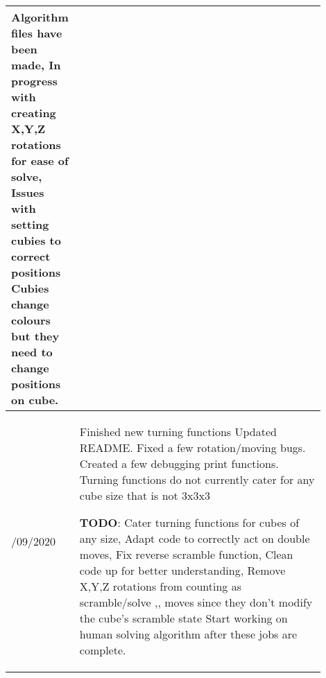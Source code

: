 \documentclass[12pt]{report} %
\begin{document}
\begin{table}[!ht]
\begin{tabular}{
        |>{\centering\arraybackslash}p{0.1\linewidth}
        |p{0.8\linewidth}|}
    Algorithm files have been made, \newline
    In progress with creating X,Y,Z rotations for ease of solve, \newline
    Issues with setting cubies to correct positions
    Cubies change colours but they need to change positions on cube.
    \\ \hline
    04/09/2020  &
    Finished new turning functions  \newline
    Updated README. \newline
    Fixed a few rotation/moving bugs.   \newline
    Created a few debugging print functions.    \newline
    Turning functions do not currently cater for any cube size that is not 3x3x3    \newline

    \textbf{TODO}:
    Cater turning functions for cubes of any size, \newline
    Adapt code to correctly act on double moves,    \newline
    Fix reverse scramble function,  \newline
    Clean code up for better understanding, \newline
    Remove X,Y,Z rotations from counting as scramble/solve ,, \newline moves since they don't modify the cube's scramble state
    Start working on human solving algorithm after these jobs are complete.
    \\ \hline
    \end{tabular}
\end{table}
\end{document}
